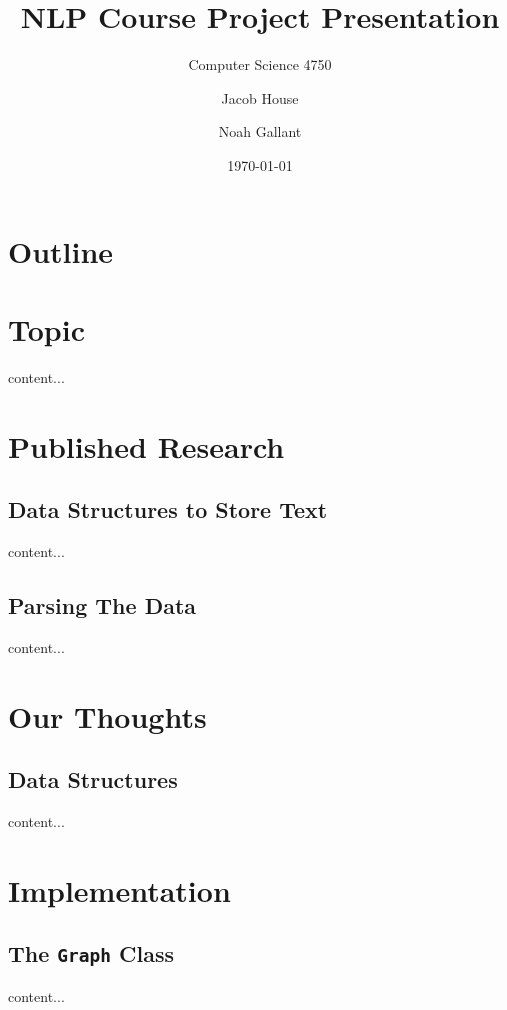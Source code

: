 \documentclass{beamer}
\title{NLP Course Project Presentation}
\subtitle{Computer Science 4750}
\author{Jacob House \and Noah Gallant}
\date{\today}
\begin{document}
\maketitle

\section*{Outline}
\begin{frame}
	\tableofcontents
\end{frame}

\section{Topic}
\begin{frame}
content...
\end{frame}

\section{Published Research}
\subsection{Data Structures to Store Text}
\begin{frame}
content...
\end{frame}

\subsection{Parsing The Data}
\begin{frame}
content...
\end{frame}

\section{Our Thoughts}
\subsection{Data Structures}
\begin{frame}
content...
\end{frame}

\section{Implementation}
\subsection{The {\tt Graph} Class}
\begin{frame}
content...
\end{frame}
\end{document}
